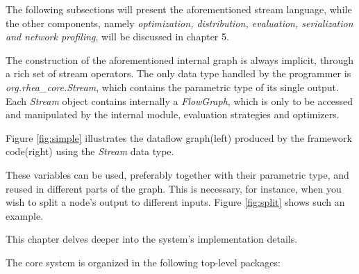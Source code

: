 \documentclass{dithesis}
\begin{document}
The following subsections will present the aforementioned stream language, while the other components, namely \textit{optimization, distribution, evaluation, serialization and network profiling}, will be discussed in chapter 5.



The construction of the aforementioned internal graph is always implicit, through a rich set of stream operators. The only data type handled by the programmer is \textit{org.rhea\_core.Stream}, which contains the parametric type of its single output. Each \textit{Stream} object contains internally a \textit{FlowGraph}, which is only to be accessed and manipulated by the internal module, evaluation strategies and optimizers.

Figure \ref{fig:simple} illustrates the dataflow graph(left) produced by the framework code(right) using the \textit{Stream} data type.


These variables can be used, preferably together with their parametric type, and reused in different parts of the graph. This is necessary, for instance, when you wish to split a node's output to different inputs. Figure \ref{fig:split} shows such an example.







This chapter delves deeper into the system's implementation details. 


The core system is organized in the following top-level packages:
\end{document}
